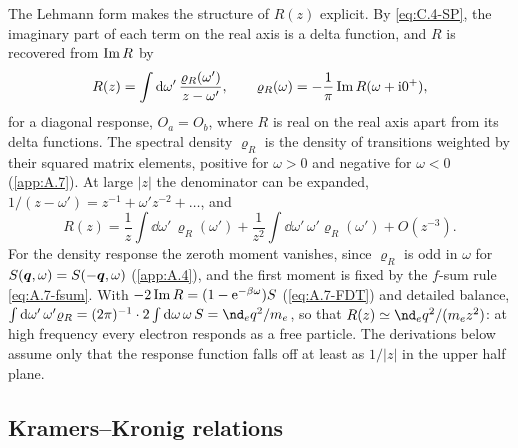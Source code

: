 The Lehmann form makes the structure of $R(z)$ explicit. By \cref{eq:C.4-SP}, the imaginary part of each term on the real axis is a delta function, and $R$ is recovered from $\operatorname{Im} R$ by
\begin{equation}
  R(z) = \int\mathrm{d}\omega'\,\frac{\varrho_R(\omega')}{z - \omega'}, \qquad \varrho_R(\omega) = -\frac{1}{\pi}\operatorname{Im} R(\omega + \mathrm{i}0^+) ,
  \label{eq:C.5-spectral}
\end{equation}
for a diagonal response, $O_a = O_b$, where $R$ is real on the real axis apart from its delta functions. The spectral density $\varrho_R$ is the density of transitions weighted by their squared matrix elements, positive for $\omega > 0$ and negative for $\omega < 0$ (\cref{app:A.7}). At large $|z|$ the denominator can be expanded, $1/(z - \omega') = z^{-1} + \omega'z^{-2} + \dots$, and
\begin{equation}
  R(z) = \frac{1}{z}\int\dd\omega'\,\varrho_R(\omega') + \frac{1}{z^2}\int\dd\omega'\,\omega'\varrho_R(\omega') + O(z^{-3}) .
  \label{eq:C.5-highfreq}
\end{equation}
For the density response the zeroth moment vanishes, since $\varrho_R$ is odd in $\omega$ for $S(\bm{q},\omega) = S(-\bm{q},\omega)$ (\cref{app:A.4}), and the first moment is fixed by the $f$-sum rule \cref{eq:A.7-fsum}. With $-2\operatorname{Im} R = (1 - \mathrm{e}^{-\beta\omega})S$ (\cref{eq:A.7-FDT}) and detailed balance, $\int\dd\omega'\,\omega'\varrho_R = (2\pi)^{-1}\cdot2\int\dd\omega\,\omega\,S = \nd_eq^2/m_e$, so that $R(z) \simeq \nd_eq^2/(m_ez^2)$: at high frequency every electron responds as a free particle. The derivations below assume only that the response function falls off at least as $1/|z|$ in the upper half plane.

\subsection{Kramers--Kronig relations}

